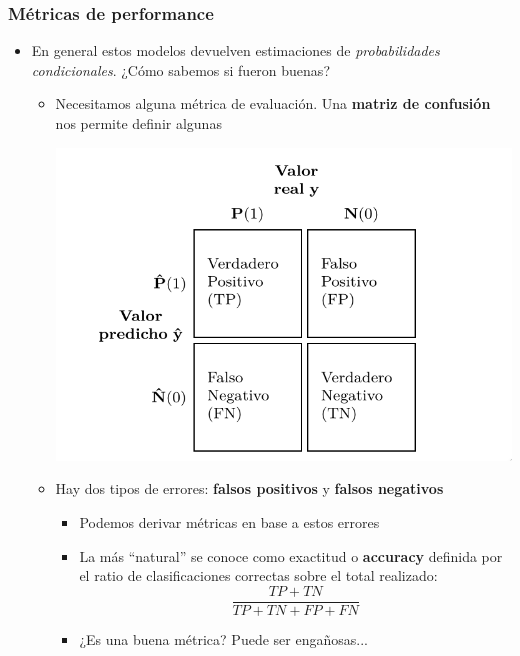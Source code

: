 \documentclass[leqno, 10pt, envcountsect]{beamer}
\numberwithin{equation}{section}
\theoremstyle{definition}
\theoremstyle{example}
\numberwithin{figure}{section}
\numberwithin{table}{section}
\let\olditem\item
\renewcommand{\item}{%
\olditem\vspace{1pt}}
\begin{document}
\begin{frame}
  \frametitle{Métricas de performance}
  \begin{itemize}
    \item En general estos modelos devuelven estimaciones de
      \textit{probabilidades condicionales}. ¿Cómo sabemos si fueron buenas?
    \begin{itemize}
      \item Necesitamos alguna métrica de evaluación. Una \textbf{matriz de
        confusión} nos permite definir algunas
        \begin{center}
          \includegraphics[scale=0.2]{confusion_matrix.png}
        \end{center}
        \item Hay dos tipos de errores: \textbf{falsos positivos}
          y \textbf{falsos negativos}
          \begin{itemize}
            \item Podemos derivar métricas en base a estos errores
            \item La más \enquote{natural} se conoce como exactitud o
              \textbf{accuracy} definida por el ratio de clasificaciones
              correctas sobre el total realizado:
              \begin{equation*}
                \frac{TP + TN}{TP + TN + FP + FN}
              \end{equation*}
            \item ¿Es una buena métrica? Puede ser engañosas...
          \end{itemize}
    \end{itemize}
  \end{itemize}
\end{frame}
\end{document}
